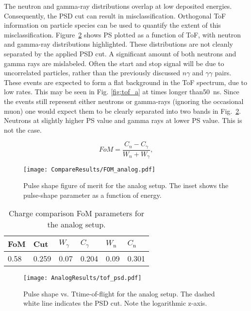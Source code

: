 \documentclass[main.tex]{subfiles}
\begin{document}
The neutron and gamma-ray distributions overlap at low deposited energies. Consequently, the PSD cut can result in misclassification. Orthogonal ToF information on particle species can be used to quantify the extent of this misclassification.
Figure~\ref{fig:tof_ps_a} shows PS plotted as a function of ToF, with neutron and gamma-ray distributions highlighted. 
These distributions are not cleanly separated by the applied PSD cut. A significant amount of both neutrons and gamma rays are mislabeled. Often the start and stop signal will be due to uncorrelated particles, rather than the previously discussed $n\gamma$ and $\gamma\gamma$ pairs. These events are expected to form a flat background in the ToF spectrum, due to low rates. This may be seen in Fig. \ref{fig:tof_a} at times longer than\SI{50}{ns}. Since the events still represent either neutrons or gamma-rays (ignoring the occasional muon) one would expect them to be clearly separated into two bands in Fig.~\ref{fig:tof_ps_a}. Neutrons at slightly higher PS value and gamma rays at lower PS value. This is not the case.

\begin{equation}
FoM = \frac{C_n - C_\gamma}{W_n + W_\gamma},
\end{equation}
\begin{figure}[h!]
	    \centering
    	    \texttt{[image: CompareResults/FOM\_analog.pdf]}
    \caption[Pulse shape figure of merit for the analog setup.]{Pulse shape figure of merit for the analog setup. The inset shows the pulse-shape parameter as a function of energy.}
    \label{fig:fom_a} 
\end{figure}
\begin{table}[h]
\center
\begin{tabular}{|l|l|l|l|l|l|}
\hline
FoM  & Cut   & $W_\gamma$ & $C_\gamma$ & $W_\textrm{n}$ & $C_\textrm{n}$ \\ \hline
0.58 & 0.259 & 0.07          & 0.204           & 0.09              & 0.301               \\ \hline
\end{tabular}
\caption{Charge comparison FoM parameters for the analog setup.}
\label{tab:fom_a}
\end{table}




\begin{figure}[h!]
    \centering
        \texttt{[image: AnalogResults/tof\_psd.pdf]}
        \caption[Pulse shape vs. Ttime-of-flight for the analog setup.]{Pulse shape vs. Ttime-of-flight for the analog setup. The dashed white line indicates the PSD cut. Note the logarithmic z-axis.}
    \label{fig:tof_ps_a} 
\end{figure}
\end{document}
